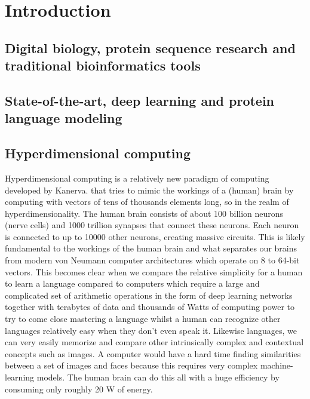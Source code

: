 \chapter[Introduction]%
{Introduction}

\section{Digital biology, protein sequence research and traditional bioinformatics tools}

\section{State-of-the-art, deep learning and protein language modeling}

\section{Hyperdimensional computing}
Hyperdimensional computing is a relatively new paradigm of computing developed by Kanerva.\cite{Kanerva2009} that tries to mimic the workings of a (human) brain by computing with vectors of tens of thousands elements long, so in the realm of hyperdimensionality. The human brain consists of about 100 billion neurons (nerve cells) and 1000 trillion synapses that connect these neurons. Each neuron is connected to up to 10000 other neurons, creating massive circuits. This is likely fundamental to the workings of the human brain and what separates our brains from modern von Neumann computer architectures which operate on 8 to 64-bit vectors. This becomes clear when we compare the relative simplicity for a human to learn a language compared to computers which require a large and complicated set of arithmetic operations in the form of deep learning networks together with terabytes of data and thousands of Watts of computing power to try to come close mastering a language whilst a human can recognize other languages relatively easy when they don't even speak it. Likewise languages, we can very easily memorize and compare other intrinsically complex and contextual concepts such as images. A computer would have a hard time finding similarities between a set of images and faces because this requires very complex machine-learning models. The human brain can do this all with a huge efficiency by consuming only roughly 20 W of energy.

